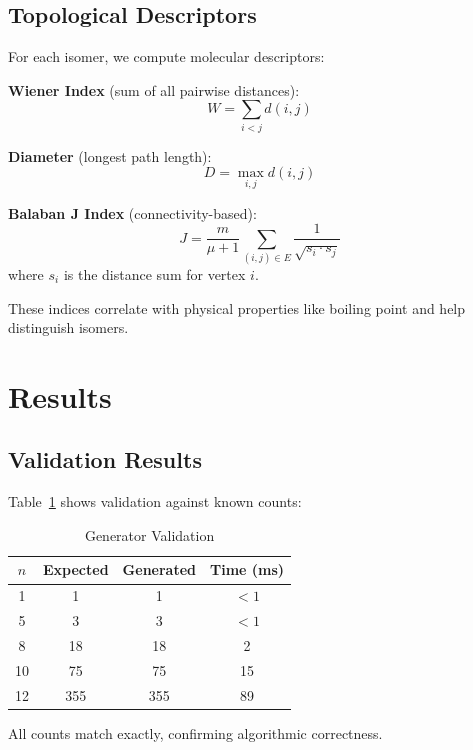 \documentclass[conference]{IEEEtran}
\begin{document}
\subsection{Topological Descriptors}

For each isomer, we compute molecular descriptors:

\textbf{Wiener Index} (sum of all pairwise distances):
\begin{equation}
W = \sum_{i<j} d(i,j)
\end{equation}

\textbf{Diameter} (longest path length):
\begin{equation}
D = \max_{i,j} d(i,j)
\end{equation}

\textbf{Balaban J Index} (connectivity-based):
\begin{equation}
J = \frac{m}{\mu+1} \sum_{(i,j) \in E} \frac{1}{\sqrt{s_i \cdot s_j}}
\end{equation}
where $s_i$ is the distance sum for vertex $i$.

These indices correlate with physical properties like boiling point and help distinguish isomers.

\section{Results}

\subsection{Validation Results}

Table~\ref{tab:validation} shows validation against known counts:

\begin{table}[htbp]
\caption{Generator Validation}
\label{tab:validation}
\centering
\begin{tabular}{cccc}
\toprule
$n$ & Expected & Generated & Time (ms) \\
\midrule
1 & 1 & 1 & $<1$ \\
5 & 3 & 3 & $<1$ \\
8 & 18 & 18 & 2 \\
10 & 75 & 75 & 15 \\
12 & 355 & 355 & 89 \\
\bottomrule
\end{tabular}
\end{table}

All counts match exactly, confirming algorithmic correctness.
\end{document}

